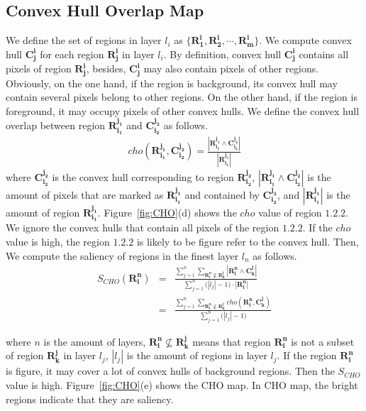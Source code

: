 \documentclass{article}
\begin{document}
\subsection{Convex Hull Overlap Map}
We define the set of regions in layer $l_i$ as $\{\mathbf{R_1^i}, \mathbf{R_2^i},\cdots, \mathbf{R_m^i}\}$. We compute convex hull $\mathbf{C_j^i}$ for each region $\mathbf{R_j^i}$ in layer $l_i$. By definition, convex hull $\mathbf{C_j^i}$ contains all pixels of region $\mathbf{R_j^i}$, besides, $\mathbf{C_j^i}$ may also contain pixels of other regions. Obviously, on the one hand, if the region is background, its convex hull may contain several pixels belong to other regions. On the other hand, if the region is foreground, it may occupy pixels of other convex hulls. We define the convex hull overlap between region $\mathbf{R_{i_1}^{j_1}}$ and $\mathbf{C_{i_2}^{j_2}}$ as follows.
\begin{eqnarray}
	cho(\mathbf{R_{i_1}^{j_1}}, \mathbf{C_{i_2}^{j_2}}) = \frac{|\mathbf{R_{i_1}^{j_1}}\wedge\mathbf{C_{i_2}^{j_2}}|}{|\mathbf{R_{i_1}^{j_1}}|}
\end{eqnarray}
where $\mathbf{C_{i_2}^{j_2}}$ is the convex hull corresponding to region $\mathbf{R_{i_2}^{j_2}}$, $|\mathbf{R_{i_1}^{j_1}}\wedge\mathbf{C_{i_2}^{j_2}}|$ is the amount of pixels that are marked as $\mathbf{R_{i_1}^{j_1}}$ and contained by $\mathbf{C_{i_2}^{j_2}}$, and $|\mathbf{R_{i_1}^{j_1}}|$ is the amount of region $\mathbf{R_{i_1}^{j_1}}$. Figure~\ref{fig:CHO}(d) shows the $cho$ value of region $1.2.2$. We ignore the convex hulls that contain all pixels of the region $1.2.2$. If the $cho$ value is high, the region $1.2.2$ is likely to be figure refer to the convex hull. Then, We compute the saliency of regions in the finest layer $l_n$ as follows.
\begin{eqnarray}
	S_{CHO}(\mathbf{R_i^n}) &=& \frac{\sum_{j=1}^n\sum_{\mathbf{R_i^n} \not\subseteq \mathbf{R_k^j}}|\mathbf{R_i^n}\wedge\mathbf{C_k^j}|}{\sum_{j=1}^n\big(|l_j|-1\big)\cdot|\mathbf{R_i^n}|} \nonumber \\
	~ &=& \frac{\sum_{j=1}^n\sum_{\mathbf{R_i^n} \not\subseteq \mathbf{R_k^j}}cho(\mathbf{R_i^n}, \mathbf{C_k^j})}{\sum_{j=1}^n\big(|l_j|-1\big)}
\end{eqnarray}

where $n$ is the amount of layers, $\mathbf{R_i^n}\not\subseteq\mathbf{R_k^j}$ means that region $\mathbf{R_i^n}$ is not a subset of region $\mathbf{R_k^j}$ in layer $l_j$, $|l_j|$ is the amount of regions in layer $l_j$. If the region $\mathbf{R_i^n}$ is figure, it may cover a lot of convex hulls of background regions. Then the $S_{CHO}$ value is high. Figure~\ref{fig:CHO}(e) shows the CHO map. In CHO map, the bright regions indicate that they are saliency.
\end{document}
